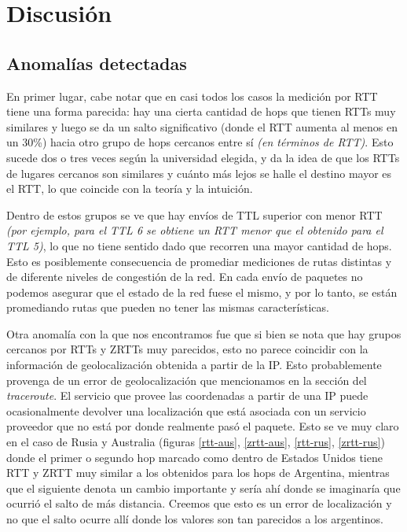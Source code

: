 \section{Discusión}

\subsection{Anomalías detectadas}

En primer lugar, cabe notar que en casi todos los casos la medición por RTT tiene una forma parecida: hay una cierta cantidad de hops que tienen RTTs muy similares y luego se da un salto significativo (donde el RTT aumenta al menos en un 30\%) hacia otro grupo de hops cercanos entre sí \textit{(en términos de RTT)}. Esto sucede dos o tres veces según la universidad elegida, y da la idea de que los RTTs de lugares cercanos son similares y cuánto más lejos se halle el destino mayor es el RTT, lo que coincide con la teoría y la intuición.


Dentro de estos grupos se ve que hay envíos de TTL superior con menor RTT \textit{(por ejemplo, para el TTL 6 se obtiene un RTT menor que el obtenido para el TTL 5)}, lo que no tiene sentido dado que recorren una mayor cantidad de hops. Esto es posiblemente consecuencia de promediar mediciones de rutas distintas y de diferente niveles de congestión de la red. En cada envío de paquetes no podemos asegurar que el estado de la red fuese el mismo, y por lo tanto, se están promediando rutas que pueden no tener las mismas características.


Otra anomalía con la que nos encontramos fue que si bien se nota que hay grupos 
cercanos por RTTs y ZRTTs muy parecidos, esto no parece coincidir con la información 
de geolocalización obtenida a partir de la IP. Esto probablemente provenga de un error 
de geolocalización que mencionamos en la sección del \textit{traceroute}. El servicio 
que provee las coordenadas a partir de una IP puede ocasionalmente devolver 
una localización que está asociada con un servicio proveedor que no está por donde 
realmente pasó el paquete. Esto se ve muy claro en el caso de Rusia y Australia 
(figuras \ref{rtt-aus}, \ref{zrtt-aus}, \ref{rtt-rus}, \ref{zrtt-rus}) donde el 
primer o segundo hop marcado como dentro de Estados Unidos tiene RTT y ZRTT muy 
similar a los obtenidos para los hops de Argentina, mientras que el siguiente denota 
un cambio importante y sería ahí donde se imaginaría que ocurrió el salto de más distancia. 
Creemos que esto es un error de localización y no que el salto ocurre allí donde 
los valores son tan parecidos a los argentinos.

